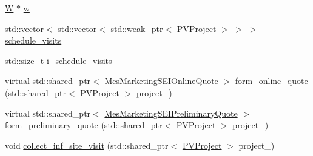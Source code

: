 {\bf }\par
\begin{DoxyCompactItemize}
\item 
\hyperlink{classsolar__core_1_1_w}{W} $\ast$ \hyperlink{classsolar__core_1_1_s_e_i_a82e0c6b5f6d83639a08c1bc357fd3466}{w}
\end{DoxyCompactItemize}

\begin{DoxyCompactItemize}
\item 
std\+::vector$<$ std\+::vector$<$ std\+::weak\+\_\+ptr$<$ \hyperlink{classsolar__core_1_1_p_v_project}{P\+V\+Project} $>$ $>$ $>$ \hyperlink{classsolar__core_1_1_s_e_i_a8729d1aaf89da5d7d8b52761b65c881c}{schedule\+\_\+visits}
\item 
std\+::size\+\_\+t \hyperlink{classsolar__core_1_1_s_e_i_a3ff238346bd126ee39aa37bfee41be43}{i\+\_\+schedule\+\_\+visits}
\item 
virtual std\+::shared\+\_\+ptr$<$ \hyperlink{classsolar__core_1_1_mes_marketing_s_e_i_online_quote}{Mes\+Marketing\+S\+E\+I\+Online\+Quote} $>$ \hyperlink{classsolar__core_1_1_s_e_i_ad532ca9d30d5988e051b75e33ce6c241}{form\+\_\+online\+\_\+quote} (std\+::shared\+\_\+ptr$<$ \hyperlink{classsolar__core_1_1_p_v_project}{P\+V\+Project} $>$ project\+\_\+)
\item 
virtual std\+::shared\+\_\+ptr$<$ \hyperlink{classsolar__core_1_1_mes_marketing_s_e_i_preliminary_quote}{Mes\+Marketing\+S\+E\+I\+Preliminary\+Quote} $>$ \hyperlink{classsolar__core_1_1_s_e_i_af598032ee3e4506cf5123aceee67cbfd}{form\+\_\+preliminary\+\_\+quote} (std\+::shared\+\_\+ptr$<$ \hyperlink{classsolar__core_1_1_p_v_project}{P\+V\+Project} $>$ project\+\_\+)
\item 
void \hyperlink{classsolar__core_1_1_s_e_i_abdcbd57fa145ee55eb8455a8bc3b4c7c}{collect\+\_\+inf\+\_\+site\+\_\+visit} (std\+::shared\+\_\+ptr$<$ \hyperlink{classsolar__core_1_1_p_v_project}{P\+V\+Project} $>$ project\+\_\+)
\end{DoxyCompactItemize}
